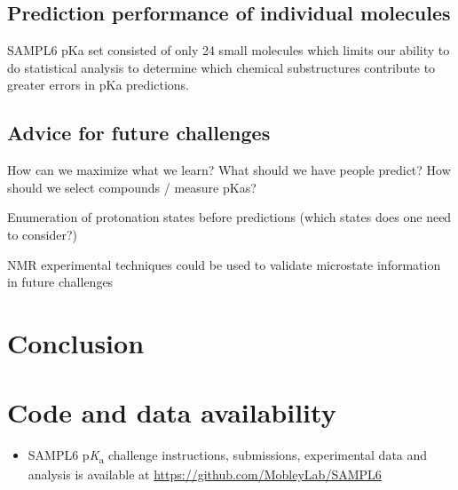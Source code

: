 \documentclass[9pt,lineno]{elife}
\newcommand{\pKa}{p\textit{K}\textsubscript{a}}
\begin{document}
\subsection{Prediction performance of individual molecules}
SAMPL6 pKa set consisted of only 24 small molecules which limits our ability to do statistical analysis to determine which chemical substructures contribute to greater errors in pKa predictions.





\subsection{Advice for future challenges}

How can we maximize what we learn?
What should we have people predict?
How should we select compounds / measure pKas?


Enumeration of protonation states before predictions (which states does one need to consider?)


NMR experimental techniques could be used to validate microstate information in future challenges



\section{Conclusion}


\section{Code and data availability}
\begin{minipage}{15cm}
\begin{itemize}

\item SAMPL6 \pKa{} challenge instructions, submissions, experimental data and analysis is available at  \href{https://github.com/MobleyLab/SAMPL6}{https://github.com/MobleyLab/SAMPL6}

\end{itemize}
\end{minipage}
\end{document}
